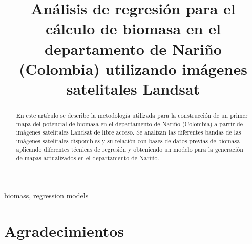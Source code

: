 \documentclass[conference, spanish]{IEEEtran}
\begin{document}
\pagestyle{empty}  

\title{Análisis de regresión para el cálculo de biomasa en el departamento de Nariño (Colombia) utilizando imágenes satelitales Landsat}

\author{
\and
{}
}

\maketitle

\begin{abstract}

En este artículo se describe la metodología utilizada para la construcción de un primer mapa del potencial de biomasa en el departamento de Nariño (Colombia) a partir de imágenes satelitales Landsat de libre acceso. Se analizan las diferentes bandas de las imágenes satelitales disponibles y su relación con bases de datos previas de biomasa aplicando diferentes técnicas de regresión y obteniendo un modelo para la generación de mapas actualizados en el departamento de Nariño.

\end{abstract}


\begin{IEEEkeywords}
biomass, regression models 
\end{IEEEkeywords}

\thispagestyle{empty} 

\IEEEpeerreviewmaketitle





%




\ifCLASSOPTIONcompsoc
  \section*{Agradecimientos}
\else
\end{document}

